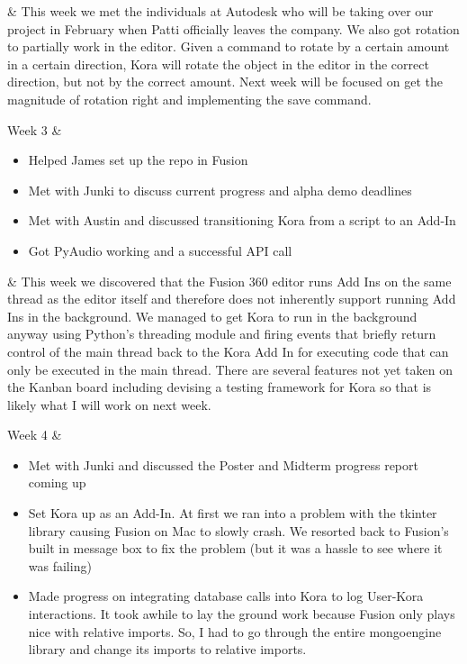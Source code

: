 \documentclass[onecolumn, draftclsnofoot,10pt, compsoc]{IEEEtran}
\begin{document}
\begin{center}
\begin{longtabu}
			&
			{
				This week we met the individuals at Autodesk who will be taking over our project in February when Patti officially leaves the company.
				We also got rotation to partially work in the editor.
				Given a command to rotate by a certain amount in a certain direction, Kora will rotate the object in the editor in the correct direction, but not by the correct amount.
				Next week will be focused on get the magnitude of rotation right and implementing the save command.
			}
			\\ \hline
			
			Week 3 
			&
			{
				\begin{itemize}
					\item Helped James set up the repo in Fusion
					\item Met with Junki to discuss current progress and alpha demo deadlines
					\item Met with Austin and discussed transitioning Kora from a script to an Add-In
					\item Got PyAudio working and a successful API call
				\end{itemize}
			}
			
			&
			{
				This week we discovered that the Fusion 360 editor runs Add Ins on the same thread as the editor itself and therefore does not inherently support running Add Ins in the background.
				We managed to get Kora to run in the background anyway using Python's threading module and firing events that briefly return control of the main thread back to the Kora Add In for executing code that can only be executed in the main thread.
				There are several features not yet taken on the Kanban board including devising a testing framework for Kora so that is likely what I will work on next week.
			}
			\\ \hline
			
			Week 4 
			&
			{
				\begin{itemize}
					\item Met with Junki and discussed the Poster and Midterm progress report coming up
					\item Set Kora up as an Add-In. At first we ran into a problem with the tkinter library causing Fusion on Mac to slowly crash. We resorted back to Fusion's built in message box to fix the problem (but it was a hassle to see where it was failing)
					\item Made progress on integrating database calls into Kora to log User-Kora interactions. It took awhile to lay the ground work because Fusion only plays nice with relative imports. So, I had to go through the entire mongoengine library and change its imports to relative imports.
				\end{itemize}
			}
			

\end{longtabu}
\end{center}
\end{document}
